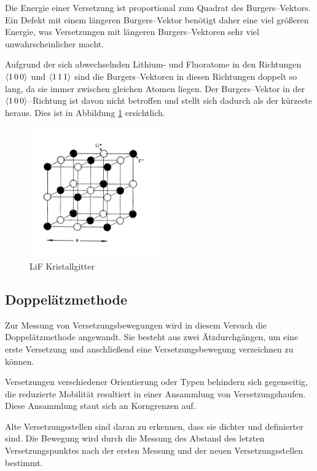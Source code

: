 \documentclass[12pt,a4paper]{scrartcl}
\numberwithin{equation}{section} %
\begin{document}
\noindent
Die Energie einer Versetzung ist proportional zum Quadrat des Burgers--Vektors. Ein Defekt mit einem längeren Burgers--Vektor benötigt daher eine viel größeren Energie, was Versetzungen mit längeren Burgers--Vektoren sehr viel unwahrscheinlicher macht.

Aufgrund der sich abwechselnden Lithium- und Fluoratome in den Richtungen $\expval{1\,0\,0}$ und $\expval{1\,1\,1}$ sind die Burgers--Vektoren in diesen Richtungen doppelt so lang, da sie immer zwischen gleichen Atomen liegen. Der Burgers--Vektor in der $\expval{1\,0\,0}$--Richtung ist davon nicht betroffen und stellt sich dadurch als der kürzeste heraus. Dies ist in Abbildung \ref{abb:LiF Kristallgitter} ersichtlich.

\begin{figure}[ht]
	\centering
	\includegraphics[width=0.5\textwidth]{../media/B2.8/LiF.pdf}
	\caption{LiF Kristallgitter \cite[S. 9]{Newey}}
	\label{abb:LiF Kristallgitter}
\end{figure}

\hypertarget{doppeluxe4tzmethode}{%
	\subsection{Doppelätzmethode}\label{doppeluxe4tzmethode}}

Zur Messung von Versetzungsbewegungen wird in diesem Versuch die Doppelätzmethode angewandt. Sie besteht aus zwei Ätzdurchgängen, um eine erste Versetzung und anschließend eine Versetzungsbewegung verzeichnen zu können.

Versetzungen verschiedener Orientierung oder Typen behindern sich gegenseitig, die reduzierte Mobilität resultiert in einer Ansammlung von Versetzungshaufen. Diese Ansammlung staut sich an Korngrenzen auf.

Alte Versetzungsstellen sind daran zu erkennen, dass sie dichter und definierter sind. Die Bewegung wird durch die Messung des Abstand des letzten Versetzungspunktes nach der ersten Messung und der neuen Versetzungsstellen bestimmt.
\end{document}
